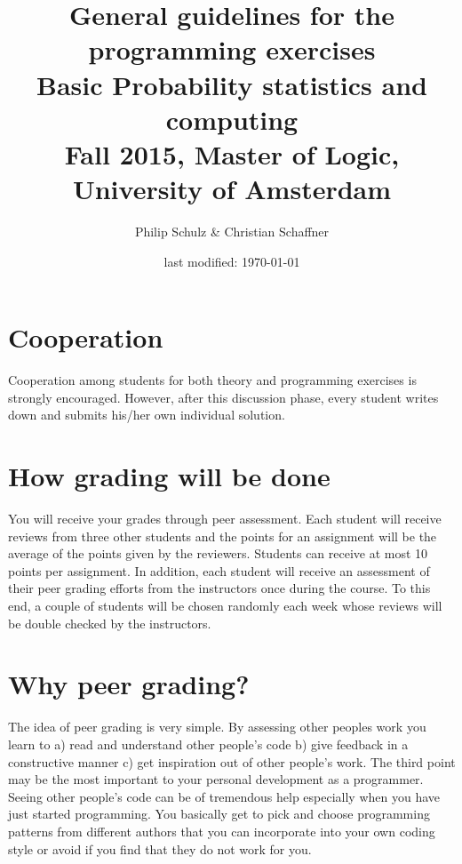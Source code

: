 \documentclass[a4paper, leqno, 11pt]{article}
\title{General guidelines for the programming exercises \\
Basic Probability statistics and computing \\[2mm]
\large{Fall 2015, Master of Logic, University of Amsterdam}}
\author{Philip Schulz \& Christian Schaffner}
\date{last modified: \today}
\begin{document}
\maketitle

\section{Cooperation}
Cooperation among students for both theory and programming exercises
is strongly encouraged.  However, after this discussion phase, every student writes down and submits his/her own individual solution.

\section{How grading will be done}
You will receive your grades through peer assessment. Each student will receive reviews from three other students and the points for an assignment
will be the average of the points given by the reviewers. Students can receive at most 10 points per assignment. In addition,
each student will receive an assessment of their peer grading efforts from the instructors once during the course. To this end, a couple of students will
be chosen randomly each week whose reviews will be double checked by the instructors. 

\section{Why peer grading?}
The idea of peer grading is very simple. By assessing other peoples work you learn to a) read and understand other people's code 
b) give feedback in a constructive manner c) get inspiration out of other people's work. The third point may be the most important
to your personal development as a programmer. Seeing other people's code can be of tremendous help especially when you have just
started programming. You basically get to pick and choose programming patterns from different authors that you can incorporate
into your own coding style or avoid if you find that they do not work for you.
\end{document}
